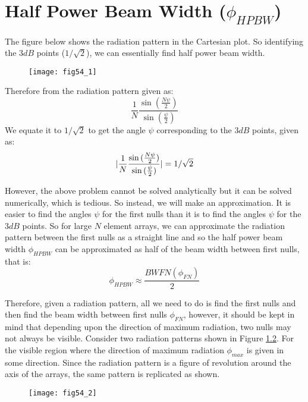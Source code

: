 \chapter{Half Power Beam Width ($\phi_{HPBW}$)}
The figure below shows the radiation pattern in the Cartesian plot. So identifying the $3dB$ points ($1/\sqrt{2}$), we can essentially find half power beam width.
\begin{figure}
	\centering
	\texttt{[image: fig54\_1]}
	\caption{}
	\label{54.1}
	
\end{figure}

Therefore from the radiation pattern given as:
$$
\frac{1}{N} \frac{\sin{(\frac{N \psi}{2})}}{\sin{(\frac{ \psi}{2})}}
$$
We equate it to $1/\sqrt{2}$ to get the angle $\psi$ corresponding to the $3dB$ points, given as:
\begin{equation}
\arrowvert \frac{1}{N} \frac{\sin{(\frac{N \psi}{2})}}{\sin{(\frac{ \psi}{2})}} \arrowvert = 1/\sqrt{2}
\end{equation}

However, the above problem cannot be solved analytically but it can be solved numerically, which is tedious. So instead, we will make an approximation. It is easier to find the angles $\psi$ for the first nulls than it is to find the angles $\psi$ for the $3dB$ points. So for large $N$ element arrays, we can approximate the radiation pattern between the first nulls as a straight line and so the half power beam width $\phi_{HPBW}$ can be approximated as half of the beam width between first nulls, that is:
\begin{equation}
\phi_{HPBW} \approx \frac{BWFN (\phi_{FN})}{2}
\end{equation}

Therefore, given a radiation pattern, all we need to do is find the first nulls and then find the beam width between first nulls $\phi_{FN}$, however, it should be kept in mind that depending upon the direction of maximum radiation, two nulls may not always be visible. Consider two radiation patterns shown in Figure \ref{54.2}. For the visible region where the direction of maximum radiation $\phi_{max}$ is given in some direction. Since the radiation pattern is a figure of revolution around the axis of the arrays, the same pattern is replicated as shown.

\begin{figure}
	\centering
	\texttt{[image: fig54\_2]}
	\caption{}
	
	\label{54.2}
	
\end{figure}

